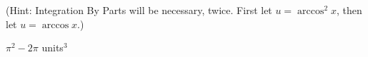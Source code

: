 {\begin{minipage}{\linewidth}\centering{}\end{minipage}

(Hint: Integration By Parts will be necessary, twice. First let $u = \arccos^2x$, then let $u=\arccos x$.)}
{$\pi^2-2\pi$ units$^3$}

